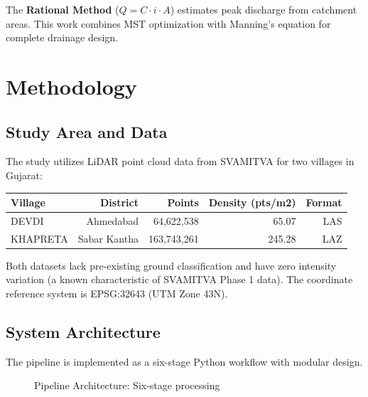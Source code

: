 \documentclass[a4paper,12pt]{article}
\begin{document}
The \textbf{Rational Method} ($Q = C \cdot i \cdot A$) estimates peak discharge from catchment areas. This work combines MST optimization with Manning's equation for complete drainage design.

\newpage

\section{Methodology}

\subsection{Study Area and Data}

The study utilizes LiDAR point cloud data from SVAMITVA for two villages in Gujarat:
\begin{longtable}{lrrrr}
	\toprule
	\textbf{Village} & \textbf{District} & \textbf{Points} & \textbf{Density (pts/m2)} & \textbf{Format} \\
	\midrule
	DEVDI            & Ahmedabad         & 64,622,538      & 65.07                     & LAS             \\
	KHAPRETA         & Sabar Kantha      & 163,743,261     & 245.28                    & LAZ             \\
	\bottomrule
\end{longtable}

Both datasets lack pre-existing ground classification and have zero intensity variation (a known characteristic of SVAMITVA Phase 1 data). The coordinate reference system is EPSG:32643 (UTM Zone 43N).

\subsection{System Architecture}

The pipeline is implemented as a six-stage Python workflow with modular design.

\bigskip

\begin{figure}[htbp]
	\centering
	\caption{Pipeline Architecture: Six-stage processing}
\end{figure}
\end{document}
